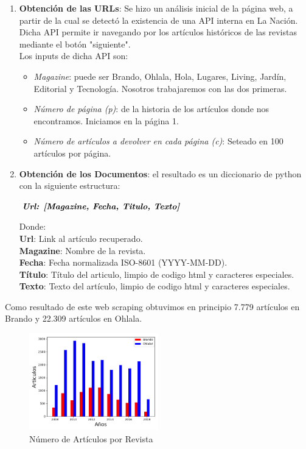 \documentclass[a4paper]{article}
\begin{document}
\begin{enumerate}
\item \textbf{Obtenci\'on de las URLs}: Se hizo un an\'alisis inicial de la p\'agina web, a partir de la cual se detect\'o la existencia de una API interna en La Naci\'on. Dicha API permite ir navegando por los art\'iculos hist\'oricos de las revistas mediante el bot\'on "siguiente".\\
Los inputs de dicha API son:
	\begin{itemize}
	\item \textit{Magazine}: puede ser Brando, Ohlala, Hola, Lugares, Living, Jard\'in, Editorial y Tecnolog\'ia. Nosotros trabajaremos con las dos primeras.
	\item \textit{N\'umero de p\'agina (p)}: de la historia de los art\'iculos donde nos encontramos. Iniciamos en la p\'agina 1.
	\item \textit{N\'umero de art\'iculos a devolver en cada p\'agina (c)}: Seteado en 100 art\'iculos por p\'agina.
	\end{itemize}
\item \textbf{Obtenci\'on de los Documentos}: el resultado es un diccionario de python con la siguiente estructura:

\vspace{1mm} %
\begin{center}
$\textbf{\textit{Url: [Magazine, Fecha, Titulo, Texto]}}$\\
\vspace{1mm} %
\end{center}
Donde:\\
\textbf{Url}: Link al art\'iculo recuperado.\\
\textbf{Magazine}: Nombre de la revista.\\
\textbf{Fecha}: Fecha normalizada ISO-8601 (YYYY-MM-DD).\\
\textbf{T\'itulo}: T\'itulo del articulo, limpio de codigo html y caracteres especiales.\\
\textbf{Texto}: Texto del art\'iculo, limpio de codigo html y caracteres especiales.\\

\end{enumerate} 

Como resultado de este web scraping obtuvimos en principio 7.779 art\'iculos en Brando y 22.309 art\'iculos en Ohlala.

\begin{figure}[H]
\centering
\includegraphics[width=0.5\textwidth]{graficos/articulosxrevista.png}
\caption{N\'umero de Art\'iculos por Revista} 
\end{figure}
\end{document}
